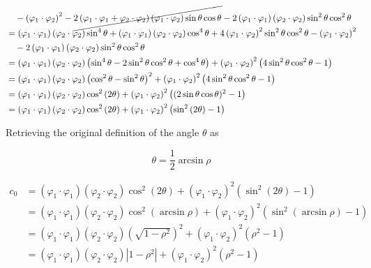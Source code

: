 \documentclass[11pt]{article}
\begin{document}
\begin{align*}
    & \quad - \left( \varphi_1\cdot\varphi_2 \right)^2 - \cancel{2 \left( \varphi_1\cdot\varphi_1 + \varphi_2\cdot\varphi_2 \right) \left( \varphi_1\cdot\varphi_2 \right) \sin \theta \cos \theta} - 2 \left( \varphi_1\cdot\varphi_1 \right) \left( \varphi_2\cdot\varphi_2 \right) \sin^2 \theta \cos^2 \theta \\
    &= \left( \varphi_1\cdot\varphi_1 \right) \left( \varphi_2\cdot\varphi_2 \right) \sin^4 \theta + \left( \varphi_1\cdot\varphi_1 \right) \left( \varphi_2\cdot\varphi_2 \right) \cos^4 \theta + 4 \left( \varphi_1\cdot\varphi_2 \right)^2 \sin^2 \theta \cos^2 \theta - \left( \varphi_1\cdot\varphi_2 \right)^2 \\
    & \quad - 2 \left( \varphi_1\cdot\varphi_1 \right) \left( \varphi_2\cdot\varphi_2 \right) \sin^2 \theta \cos^2 \theta \\
    &= \left( \varphi_1\cdot\varphi_1 \right) \left( \varphi_2\cdot\varphi_2 \right) \left( \sin^4 \theta - 2 \sin^2 \theta \cos^2 \theta + \cos^4 \theta \right) + \left( \varphi_1\cdot\varphi_2 \right)^2 \left( 4 \sin^2 \theta \cos^2 \theta - 1 \right) \\
    &= \left( \varphi_1\cdot\varphi_1 \right) \left( \varphi_2\cdot\varphi_2 \right) \left( \cos^2 \theta - \sin^2 \theta \right)^2 + \left( \varphi_1\cdot\varphi_2 \right)^2 \left( 4 \sin^2 \theta \cos^2 \theta - 1 \right) \\
    &= \left( \varphi_1\cdot\varphi_1 \right) \left( \varphi_2\cdot\varphi_2 \right) \cos^2 \left( 2\theta \right) + \left( \varphi_1\cdot\varphi_2 \right)^2 \left( (2 \sin \theta \cos \theta)^2 - 1 \right) \\
    &= \left( \varphi_1\cdot\varphi_1 \right) \left( \varphi_2\cdot\varphi_2 \right) \cos^2 \left( 2\theta \right) + \left( \varphi_1\cdot\varphi_2 \right)^2 \left( \sin^2 \left( 2\theta \right) - 1 \right) \\
\end{align*}

Retrieving the original definition of the angle \(\theta\) as

\[\theta = \frac{1}{2} \arcsin \rho\]

\begin{align*}
c_0 &= \left( \varphi_1\cdot\varphi_1 \right) \left( \varphi_2\cdot\varphi_2 \right) \cos^2 \left( 2\theta \right) + \left( \varphi_1\cdot\varphi_2 \right)^2 \left( \sin^2 \left( 2\theta \right) - 1 \right) \\
    &= \left( \varphi_1\cdot\varphi_1 \right) \left( \varphi_2\cdot\varphi_2 \right) \cos^2 \left( \arcsin \rho \right) + \left( \varphi_1\cdot\varphi_2 \right)^2 \left( \sin^2 \left( \arcsin \rho \right) - 1 \right) \\
    &= \left( \varphi_1\cdot\varphi_1 \right) \left( \varphi_2\cdot\varphi_2 \right) \left( \sqrt{1 - \rho^2} \right)^2 + \left( \varphi_1\cdot\varphi_2 \right)^2 \left( \rho^2 - 1 \right) \\
    &= \left( \varphi_1\cdot\varphi_1 \right) \left( \varphi_2\cdot\varphi_2 \right) \left| 1 - \rho^2 \right| + \left( \varphi_1\cdot\varphi_2 \right)^2 \left( \rho^2 - 1 \right) \\
\end{align*}
\end{document}
